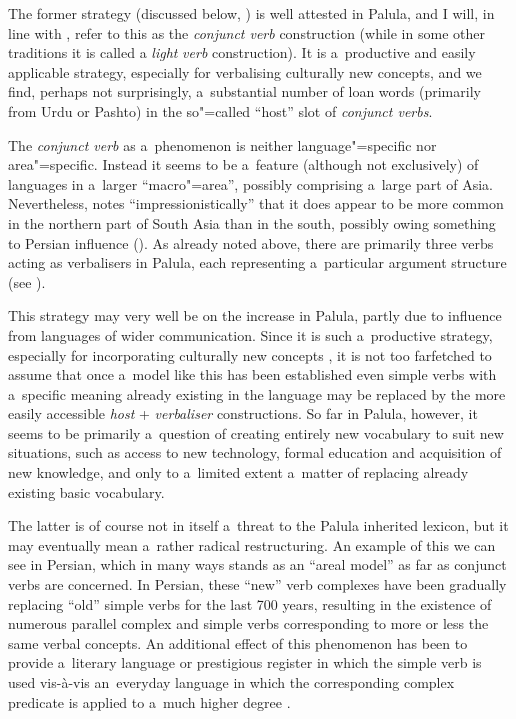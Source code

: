 The former strategy (discussed below, ) is well attested in Palula, and I will, in line with \citet[326]{masica1991}, refer to this as the \textit{conjunct verb} construction (while in some other traditions it is called a \textit{light} \textit{verb} construction). It is a~productive and easily applicable strategy, especially for verbalising culturally new concepts, and we find, perhaps not surprisingly, a~substantial number of loan words (primarily from Urdu or Pashto) in the so"=called ``host'' slot of \textit{conjunct verbs}. 



The \textit{conjunct verb} as a~phenomenon is neither language"=specific nor area"=specific. Instead it seems to be a~feature (although not exclusively) of languages in a~larger ``macro"=area'', possibly comprising a~large part of Asia. Nevertheless, \citeauthor{masica1991} notes ``impressionistically'' that it does appear to be more common in the northern part of South Asia than in the south, possibly owing something to Persian influence (\citeyear[368]{masica1991}). As already noted above, there are primarily three verbs acting as verbalisers in Palula, each representing a~particular argument structure (see ). 



This strategy may very well be on the increase in Palula, partly due to influence from languages of wider communication. Since it is such a~productive strategy, especially for incorporating culturally new concepts \citep[85]{gambhir1993}, it is not too farfetched to assume that once a~model like this has been established even simple verbs with a~specific meaning already existing in the language may be replaced by the more easily accessible \textit{host} + \textit{verbaliser} constructions. So far in Palula, however, it seems to be primarily a~question of creating entirely new vocabulary to suit new situations, such as access to new technology, formal education and acquisition of new knowledge, and only to a~limited extent a~matter of replacing already existing basic vocabulary. 



The latter is of course not in itself a~threat to the Palula inherited lexicon, but it may eventually mean a~rather radical restructuring. An example of this we can see in Persian, which in many ways stands as an ``areal model'' as far as conjunct verbs are concerned. In Persian, these ``new'' verb complexes have been gradually replacing ``old'' simple verbs for the last 700 years, resulting in the existence of numerous parallel complex and simple verbs corresponding to more or less the same verbal concepts. An additional effect of this phenomenon has been to provide a~literary language or prestigious register in which the simple verb is used vis-à-vis an~everyday language in which the corresponding complex predicate is applied to a~much higher degree \citep[1369]{follietal2005}. 




